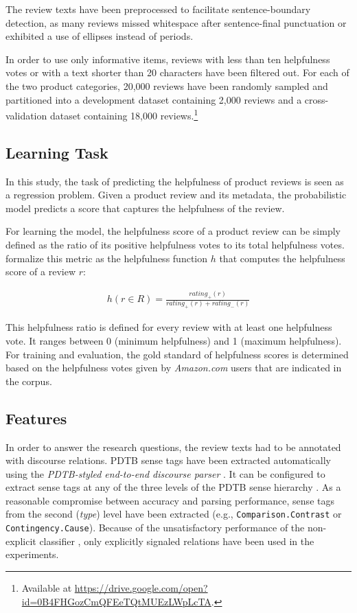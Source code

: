 \documentclass[
    a4paper,%
    12pt,%
    oneside,%
    toc=bibliography,
    final,
]{scrartcl}
\begin{document}
The review texts have been preprocessed to facilitate sentence-boundary detection, as many reviews missed whitespace after sentence-final punctuation or exhibited a use of ellipses instead of periods.

In order to use only informative items, reviews with less than ten helpfulness votes or with a text shorter than 20 characters have been filtered out. For each of the two product categories, 20,000 reviews have been randomly sampled and partitioned into a development dataset containing 2,000 reviews and a cross-validation dataset containing 18,000 reviews.\footnote{Available at \url{https://drive.google.com/open?id=0B4FHGozCmQFEeTQtMUEzLWpLcTA}.}

\subsection{Learning Task}

In this study, the task of predicting the helpfulness of product reviews is seen as a regression problem. Given a product review and its metadata, the probabilistic model predicts a score that captures the helpfulness of the review.

For learning the model, the helpfulness score of a product review can be simply defined as the ratio of its positive helpfulness votes to its total helpfulness votes. \citet[424]{Kim2006} formalize this metric as the helpfulness function $ h $ that computes the helpfulness score of a review $ r $:

\vspace{-2em}

\begin{align}
\label{helpfulness-fuction}
h(r \in R) = \frac{rating_+(r)}{rating_+(r) + rating_-(r)}
\end{align}

This helpfulness ratio is defined for every review with at least one helpfulness vote. It ranges between 0 (minimum helpfulness) and 1 (maximum helpfulness). For training and evaluation, the gold standard of helpfulness scores is determined based on the helpfulness votes given by \textit{Amazon.com} users that are indicated in the corpus.

\subsection{Features}

In order to answer the research questions, the review texts had to be annotated with discourse relations. PDTB sense tags have been extracted automatically using the \textit{PDTB-styled end-to-end discourse parser} \citep{Lin2014}. It can be configured to extract sense tags at any of the three levels of the PDTB sense hierarchy \citep[see][5]{Prasad2008}. As a reasonable compromise between accuracy and parsing performance, sense tags from the second (\textit{type}) level have been extracted (e.g., \lstinline|Comparison.Contrast| or \lstinline|Contingency.Cause|). Because of the unsatisfactory performance of the non-explicit classifier \citep[see][175]{Lin2014}, only explicitly signaled relations have been used in the experiments.
\end{document}
